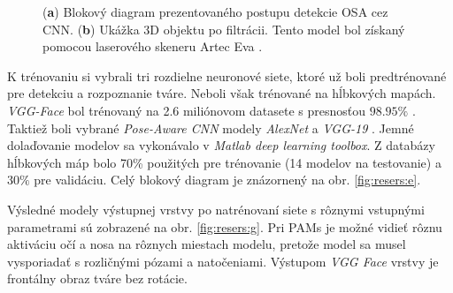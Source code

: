 \begin{figure}[h]
\begin{subfigure}[b]{0.37\textwidth}
		\caption{}
		\label{fig:resers:f}
	\end{subfigure}
	\caption{(\textbf{a}) Blokový diagram prezentovaného postupu detekcie OSA cez CNN. 
	(\textbf{b}) Ukážka 3D objektu po filtrácii. Tento model bol získaný pomocou laserového skeneru Artec Eva \cite{Islam}.} 
\label{fig:resers:2}
\end{figure}

K trénovaniu si vybrali tri rozdielne neuronové siete, ktoré už boli predtrénované pre detekciu a rozpoznanie tváre. Neboli však trénované na hĺbkových mapách.  \textit{VGG-Face} bol trénovaný na 2.6 miliónovom datasete s presnosťou $ 98.95\% $ \cite{parkhi2015deep}. Taktiež boli vybrané \textit{Pose-Aware CNN} modely \cite{masi2016pose} \textit{AlexNet} \cite{krizhevsky2012imagenet} a \textit{VGG-19} \cite{chatfield2014return}. 
Jemné dolaďovanie modelov sa vykonávalo v \textit{Matlab deep learning toolbox}. Z databázy hĺbkových máp bolo 70\% použitých pre trénovanie (14 modelov na testovanie) a $ 30\% $ pre validáciu. Celý blokový diagram je znázornený na obr. \ref{fig:resers:e}. 

Výsledné modely výstupnej vrstvy po natrénovaní siete s rôznymi vstupnými parametrami sú zobrazené na obr. \ref{fig:resers:g}. Pri PAMs je možné vidieť rôznu aktiváciu očí a nosa na rôznych miestach modelu, pretože model sa musel vysporiadať s rozličnými pózami a natočeniami.  Výstupom \textit{VGG Face} vrstvy je frontálny obraz tváre bez rotácie.

